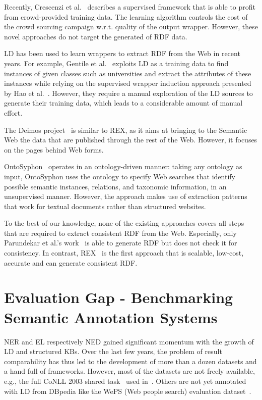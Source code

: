 Recently, Crescenzi et al.~\cite{Crescenzi2013} describes a supervised framework that is able to profit from crowd-provided training data. 
The learning algorithm controls the cost of the crowd sourcing campaign w.r.t. quality of the output wrapper.
However, these novel approaches do not target the generated of \ac{RDF} data.

\ac{LD} has been used to learn wrappers to extract \ac{RDF} from the Web in recent years. 
For example, Gentile et al.~\cite{Gentile2013} exploits \ac{LD} as a training data to find instances of given classes such as universities and extract the attributes of these instances while relying on the supervised wrapper induction approach presented by Hao et al.~\cite{Hao2011}. However, they require a manual exploration of the \ac{LD} sources to generate their training data, which leads to a considerable amount of manual effort.

The {\sc Deimos} project~\cite{conf/aaaiss/ParundekarKA10} is similar to REX, as it aims at bringing to the Semantic Web the data that are published through the rest of the Web. 
However, it focuses on the pages behind Web forms.

OntoSyphon~\cite{DBLP:journals/ws/McDowellC08} operates in an ontology-driven manner: taking any ontology as input, OntoSyphon uses the ontology to specify Web searches that identify possible semantic instances, relations, and taxonomic information, in an unsupervised manner. However, the approach makes use of extraction patterns that work for textual documents rather than structured websites.

To the best of our knowledge, none of the existing approaches covers all steps that are required to extract consistent \ac{RDF} from the Web. 
Especially, only Parundekar et al.'s work~\cite{conf/aaaiss/ParundekarKA10} is able to generate \ac{RDF} but does not check it for consistency.
In contrast, REX~\cite{rex} is the first approach that is scalable, low-cost, accurate and can generate consistent \ac{RDF}. 




\section{Evaluation Gap - Benchmarking Semantic Annotation Systems}

\ac{NER} and \ac{EL} respectively \ac{NED} gained significant momentum with the growth of \ac{LD} and structured \ac{KB}s. 
Over the last few years, the problem of result comparability has thus led to the development of more than a dozen datasets and a hand full of frameworks.
However, most of the datasets are not freely available, e.g., the full CoNLL 2003 shared task~\cite{conll2003} used in~\cite{AIDA}.
Others are not yet annotated with \ac{LD} from DBpedia like the WePS (Web people search) evaluation dataset~\cite{WEPS}.

